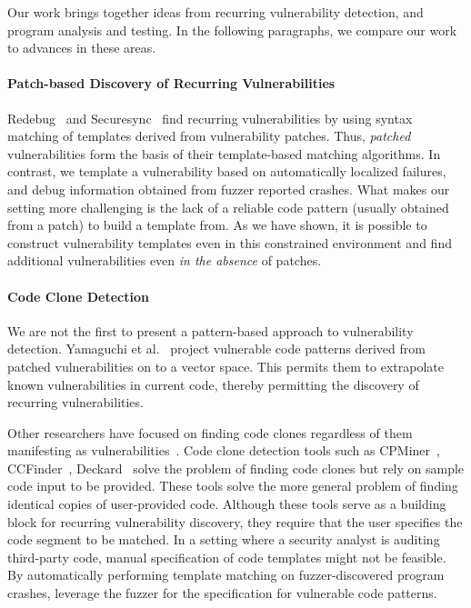 Our work brings together ideas from recurring vulnerability detection, and program analysis and testing.
In the following paragraphs, we compare our work to advances in these areas.

\paragraph{Patch-based Discovery of Recurring Vulnerabilities}
Redebug~\cite{jang2012redebug} and Securesync~\cite{pham2010detection} find recurring vulnerabilities by using syntax matching of templates derived from vulnerability patches.
Thus, {\it patched} vulnerabilities form the basis of their template-based matching algorithms.
In contrast, we template a vulnerability based on automatically localized failures, and debug information obtained from fuzzer reported crashes.
What makes our setting more challenging is the lack of a reliable code pattern (usually obtained from a patch) to build a template from.
As we have shown, it is possible to construct vulnerability templates even in this constrained environment and find additional vulnerabilities even {\it in the absence} of patches.

\paragraph{Code Clone Detection}
We are not the first to present a pattern-based approach to vulnerability detection.
Yamaguchi et al.~\cite{yamaguchi2012generalized} project vulnerable code patterns derived from patched vulnerabilities on to a vector space.
This permits them to extrapolate known vulnerabilities in current code, thereby permitting the discovery of recurring vulnerabilities.

Other researchers have focused on finding code clones regardless of them manifesting as vulnerabilities~\cite{bellon2007comparison, baxter1998clone,kontogiannis1996pattern,marcus2001identification}.
Code clone detection tools such as CPMiner~\cite{li2006cp}, CCFinder~\cite{kamiya2002ccfinder}, Deckard~\cite{jiang2007deckard} solve the problem of finding code clones but rely on sample code input to be provided.
These tools solve the more general problem of finding identical copies of user-provided code.
Although these tools serve as a building block for recurring vulnerability discovery, they require that the user specifies the code segment to be matched.
In a setting where a security analyst is auditing third-party code, manual specification of code templates might not be feasible.
By automatically performing template matching on fuzzer-discovered program crashes, leverage the fuzzer for the specification for vulnerable code patterns.

